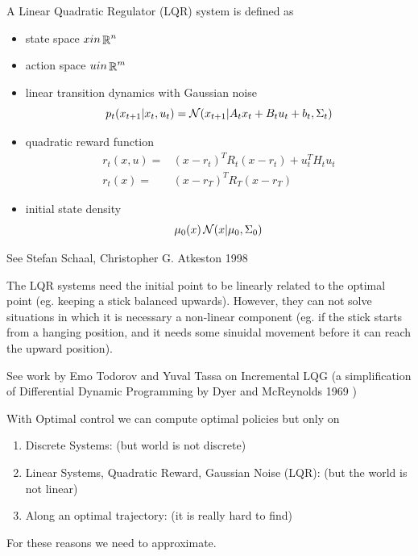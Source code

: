\documentclass[b5paper]{report}
\begin{document}
A Linear Quadratic Regulator (LQR) system is defined as

\begin{itemize}
  \item state space $x in \operatorname*{\mathbb{\mathop{R}}}^n$
  \item action space $u in \operatorname*{\mathbb{\mathop{R}}}^m$
  \item linear transition dynamics with Gaussian noise
    \begin{equation}
      p_t(x_{t+1}|x_t, u_t) = \operatorname*{\mathcal{N}}(x_{t+1}|A_t x_t + B_t u_t + b_t, \Sigma_t)
    \end{equation}
  \item quadratic reward function
    \begin{align}
      r_t(x,u) =& (x-r_t)^T R_t(x-r_t) + u_t^T H_t u_t \\
      r_t(x) =& (x-r_T)^T R_T(x-r_T)
    \end{align}
  \item initial state density
    \begin{equation}
      \mu_0(x) \operatorname*{\mathcal{N}}(x|\mu_0, \Sigma_0)
    \end{equation}
\end{itemize}

See Stefan Schaal, Christopher G. Atkeston 1998 \cite{schaal1998constructive}

The LQR systems need the initial point to be linearly related to the optimal
point (eg. keeping a stick balanced upwards). However, they can not solve
situations in which it is necessary a non-linear component (eg. if the stick
  starts from a hanging position, and it needs some sinuidal movement before it
can reach the upward position).

See work by Emo Todorov and Yuval Tassa on Incremental LQG (a simplification of
  Differential Dynamic Programming by Dyer and McReynolds 1969
\cite{dyer1969optimization})

With Optimal control we can compute optimal policies but only on

\begin{enumerate}
  \item Discrete Systems: (but world is not discrete)
  \item Linear Systems, Quadratic Reward, Gaussian Noise (LQR): (but the world
    is not linear)
  \item Along an optimal trajectory: (it is really hard to find)
\end{enumerate}

For these reasons we need to approximate.
\end{document}
